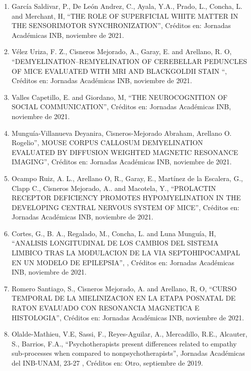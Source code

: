 \documentclass[12pt]{article}
\begin{document}
\begin{enumerate}
\item García Saldivar, P., De León Andrez, C., Ayala, Y.A., Prado, L., Concha, L. and Merchant, H, “THE ROLE OF SUPERFICIAL WHITE 
MATTER IN THE SENSORIMOTOR SYNCHRONIZATION”, Créditos en: Jornadas Académicas INB, noviembre de 2021.

\item Vélez Uriza, F. Z., Cisneros Mejorado, A., Garay, E. and Arellano, R. O, “DEMYELINATION–REMYELINATION OF CEREBELLAR PEDUNCLES OF 
MICE EVALUATED WITH MRI AND BLACKGOLDII STAIN “, Créditos en: Jornadas Académicas INB, noviembre de 2021.

\item Valles Capetillo, E. and Giordano, M, “THE NEUROCOGNITION OF SOCIAL COMMUNICATION”, Créditos en: Jornadas Académicas INB, 
noviembre 
de 2021.

\item Munguía-Villanueva Deyanira, Cisneros-Mejorado Abraham, Arellano O. Rogelio”, MOUSE CORPUS CALLOSUM DEMYELINATION EVALUATED BY 
DIFFUSION WEIGHTED MAGNETIC RESONANCE IMAGING”, Créditos en: Jornadas Académicas INB, noviembre de 2021.

\item Ocampo Ruiz, A. L., Arellano O, R., Garay, E., Martínez de la Escalera, G., Clapp C., Cisneros Mejorado, A.. and Macotela, Y., 
“PROLACTIN RECEPTOR DEFICIENCY PROMOTES HYPOMYELINATION IN THE DEVELOPING CENTRAL NERVOUS SYSTEM OF MICE”, Créditos en: Jornadas 
Académicas INB, noviembre de 2021.

\item Cortes, G., B. A., Regalado, M., Concha, L. and Luna Munguía, H, “ANALISIS LONGITUDINAL DE LOS CAMBIOS DEL SISTEMA LIMBICO TRAS 
LA MODULACION DE LA VIA SEPTOHIPOCAMPAL EN UN MODELO DE EPILEPSIA”, , Créditos en: Jornadas Académicas INB, noviembre de 2021.

\item Romero Santiago, S., Cisneros Mejorado, A. and Arellano, R, O, “CURSO TEMPORAL DE LA MIELINIZACION EN LA ETAPA POSNATAL DE RATON 
EVALUADO CON RESONANCIA MAGNETICA E HISTOLOGIA”, Créditos en: Jornadas Académicas INB, noviembre de 2021.

\item Olalde-Mathieu, V.E, Sassi, F., Reyes-Aguilar, A., Mercadillo, R.E., Alcauter, S., Barrios, F.A., “Psychotherapists present 
differences related to empathy sub-processes when compared to nonpsychotherapists”, Jornadas Académicas del INB-UNAM, 23-27 , Créditos 
en: Otro, septiembre de 2019.


\end{enumerate}
\end{document}
